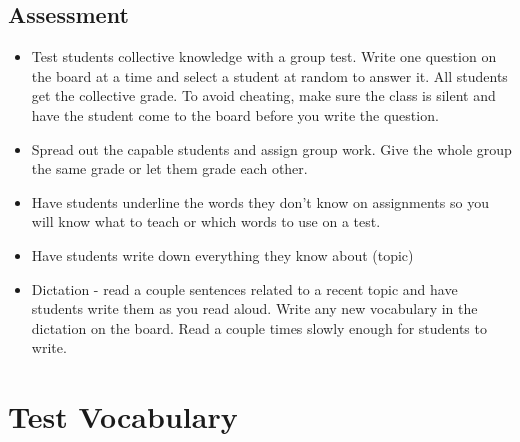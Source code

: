 \subsection{Assessment}
\begin{itemize}
\item Test students collective knowledge with a group test. Write one question
on the board at a time and select a student at random to answer it.
All students get the collective grade. To avoid cheating, make sure
the class is silent and have the student come to the board before
you write the question. 
\item Spread out the capable students and assign group work. Give the whole
group the same grade or let them grade each other. 
\item Have students underline the words they don't know on assignments so
you will know what to teach or which words to use on a test.
\item Have students write down everything they know about (topic)
\item Dictation - read a couple sentences related to a recent topic and
have students write them as you read aloud. Write any new vocabulary
in the dictation on the board. Read a couple times slowly enough for
students to write.
\end{itemize}

\section*{Test Vocabulary}

